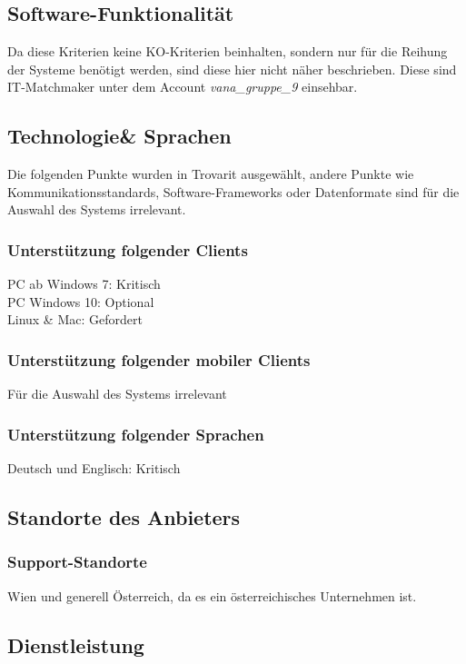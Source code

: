 \subsection{Software-Funktionalität}
Da diese Kriterien keine KO-Kriterien beinhalten, sondern nur für die Reihung der Systeme benötigt werden, sind diese hier nicht näher beschrieben. Diese sind IT-Matchmaker unter dem Account \textit{vana\_gruppe\_9} einsehbar.

\subsection{Technologie\& Sprachen}
Die folgenden Punkte wurden in Trovarit ausgewählt, andere Punkte wie Kommunikationsstandards, Software-Frameworks oder Datenformate sind für die Auswahl des Systems irrelevant.
\subsubsection{Unterstützung folgender Clients}
PC ab Windows 7: Kritisch\\
PC Windows 10: Optional\\
Linux \& Mac: Gefordert
\subsubsection{Unterstützung folgender mobiler Clients}
Für die Auswahl des Systems irrelevant
\subsubsection{Unterstützung folgender Sprachen}
Deutsch und Englisch: Kritisch

\subsection{Standorte des Anbieters}
\subsubsection{Support-Standorte}
Wien und generell Österreich, da es ein österreichisches Unternehmen ist.
\subsection{Dienstleistung}
